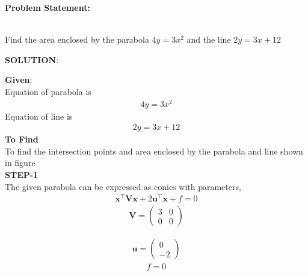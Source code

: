 \documentclass[10pt,a4paper]{report}
\newcommand{\myvec}[1]{\ensuremath{\begin{pmatrix}#1\end{pmatrix}}}
\let\vec\mathbf
\let\vec\mathbf
\begin{document}
\begin{multicols}{2}

\raggedright \textbf{Problem Statement:}\vspace{2mm}
\raggedright \\Find the area enclosed by the parabola $4y=3x^2 $ and the line $2y=3x+12$\\
\vspace{5mm}
\raggedright \textbf{SOLUTION}:\vspace{2mm}\\

\raggedright \textbf{Given}:\vspace{2mm}\\
Equation of parabola is \\\vspace{1mm}
\begin{align}
4y=3x^2
\end{align}
Equation of line is \\ \vspace{1mm}
\begin{align}
2y=3x+12
\end{align}
\textbf{To Find }\vspace{2mm}\\
To find the intersection points and area enclosed by the parabola and line shown in figure\vspace{2mm}  \\ 
\textbf{STEP-1}\vspace{2mm}\\
The given parabola can be expressed as conics with parameters,\\ \vspace{1mm}
\begin{align}
	\vec{x}^{\top}\vec{V}\vec{x} + 2\vec{u}^{\top} \vec{x} + f = 0
\end{align}
\begin{align}
\vec{V}=\myvec{
3 & 0\\
0 & 0
}
\end{align}

\begin{align}
\vec{u}=\myvec{0\\-2}
\end{align} 
\begin{align}
f=0
\end{align} \vspace{2mm}



\end{multicols}
\end{document}

